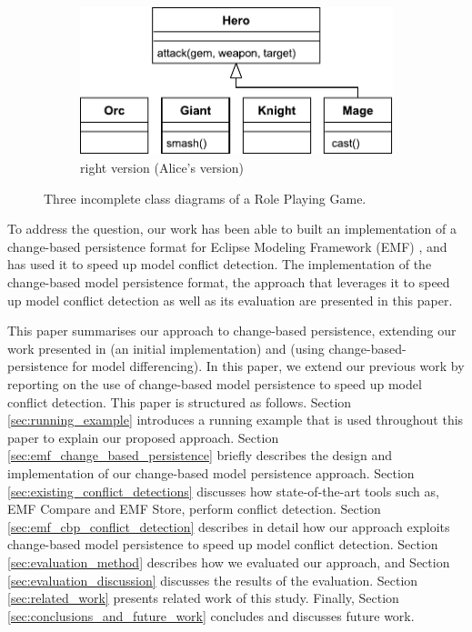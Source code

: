 \begin{figure}[]
\begin{subfigure}[t]{0.31\linewidth}
    \includegraphics[width=\linewidth]{class_diagram_right}
    \caption{right version (Alice's version)}
    \label{fig:class_diagram_right}
  \end{subfigure}
  \caption{Three incomplete class diagrams of a Role Playing Game.}
  \label{fig:class_diagram_rpg}
\end{figure}

To address the question, our work has been able to built an implementation of a change-based persistence format for Eclipse Modeling Framework (EMF) \cite{eclipse2019emf}, and has used it to speed up model conflict detection. The implementation of the change-based model persistence format, the approach that leverages it to speed up model conflict detection as well as its evaluation are presented in this paper. 

This paper summarises our approach to change-based persistence, extending our work presented in \cite{DBLP:conf/models/YohannisKP17} (an initial implementation) and \cite{yohannis2019efficient} (using change-based-persistence for model differencing). In this paper, we extend our
previous work by reporting on the use of change-based model persistence to speed up model conflict detection. This paper is structured as follows. Section \ref{sec:running_example} introduces a running example that is used throughout this paper to explain our proposed approach. Section \ref{sec:emf_change_based_persistence} briefly describes the design and implementation of our change-based model persistence approach.  
Section \ref{sec:existing_conflict_detections} discusses how state-of-the-art tools such as, EMF Compare and EMF Store, perform conflict detection. Section \ref{sec:emf_cbp_conflict_detection} describes in detail how our approach exploits change-based model persistence to speed up model conflict detection. Section \ref{sec:evaluation_method} describes how we evaluated our approach, and Section \ref{sec:evaluation_discussion} discusses the results of the evaluation. Section \ref{sec:related_work} presents related work of this study. Finally, Section \ref{sec:conclusions_and_future_work} concludes and discusses future work.

